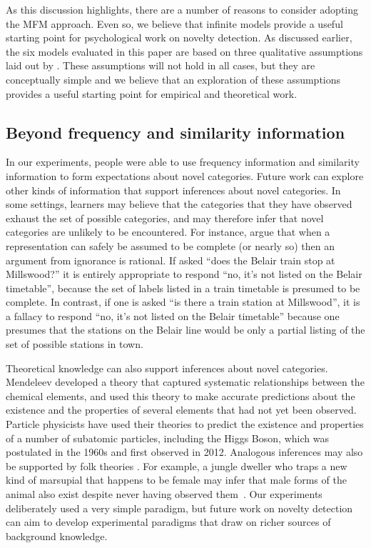 \documentclass[doc]{apa6}
\begin{document}
As this discussion highlights, there are a number of reasons to consider adopting the MFM approach. Even so, we believe that infinite models provide a useful starting point for psychological work on novelty detection. As discussed earlier, the six models evaluated in this paper are based on three qualitative assumptions laid out by .  These assumptions will not hold in all cases, but they are conceptually simple and we believe that an exploration of these assumptions provides a useful starting point for empirical and theoretical work.


\subsection{Beyond frequency and similarity information}

In our experiments, people were able to use frequency information and similarity information to form expectations about novel categories. Future work can explore other kinds of information that support inferences about novel categories. In some settings, learners may believe that the categories that they have observed exhaust the set of possible categories, and may therefore infer that novel categories are unlikely to be encountered.  For instance,  argue that when a representation can safely be assumed to be complete (or nearly so) then an argument from ignorance is rational. If asked ``does the Belair train stop at Millswood?'' it is entirely appropriate to respond ``no, it's not listed on the Belair timetable'', because the set of labels listed in a train timetable is presumed to be complete.  In contrast, if one is asked ``is there a train station at Millswood'', it is a fallacy to respond ``no, it's not listed on the Belair timetable'' because one presumes that the stations on the Belair line would be only a partial listing of the set of possible stations in town.

Theoretical knowledge  can also support inferences about novel categories.  Mendeleev developed a theory that captured systematic relationships between the chemical elements, and used this theory to make accurate predictions about the existence and the properties of several  elements that had not yet been observed. Particle physicists have used their theories to predict the existence and properties of a number of subatomic particles, including the Higgs Boson, which was postulated in the 1960s and first observed in 2012.  Analogous inferences may also be supported by folk theories \cite{gopnikm97}.  For example, a jungle dweller who traps a new kind of marsupial that happens to be female may infer that male forms of the animal also exist despite never having observed them~\cite{taylor90}. Our experiments deliberately used a very simple paradigm, but future work on novelty detection can aim to develop experimental paradigms that draw on richer sources of background knowledge.
\end{document}
